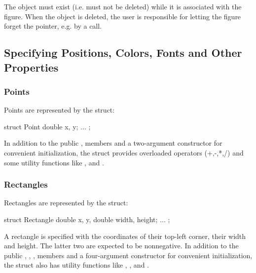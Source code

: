 \begin{caution}
The object must exist (i.e. must not be deleted) while it is
associated with the figure. When the object is deleted, the user
is responsible for letting  the figure forget the pointer,
e.g. by a   call.
\end{caution}


\subsection{Specifying Positions, Colors, Fonts and Other Properties}
\label{sec:graphics:figure-positions-colors-fonts-etc}

\subsubsection{Points}
\label{sec:graphics:canvas-points}

Points are represented by the  struct:

\begin{cpp}
struct Point {
    double x, y;
    ...
};
\end{cpp}

In addition to the public ,  members and a two-argument
constructor for convenient initialization, the struct provides overloaded
operators (+,-,*,/) and some utility functions like ,
 and .

\subsubsection{Rectangles}
\label{sec:graphics:canvas-rectangles}

Rectangles are represented by the  struct:

\begin{cpp}
struct Rectangle {
    double x, y,
    double width, height;
    ...
};
\end{cpp}

A rectangle is specified with the coordinates of their top-left corner,
their width and height. The latter two are expected to be nonnegative. In
addition to the public , , ,  members
and a four-argument constructor for convenient initialization, the struct
also has utility functions like , ,
 and .

